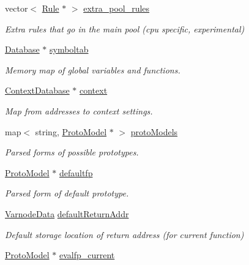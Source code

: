 \begin{DoxyCompactItemize}
vector$<$ \mbox{\hyperlink{class_rule}{Rule}} $\ast$ $>$ \mbox{\hyperlink{class_architecture_a6218d36328733cd9798ad6c3dbe921d8}{extra\+\_\+pool\+\_\+rules}}
\begin{DoxyCompactList}\small\item\em Extra rules that go in the main pool (cpu specific, experimental) \end{DoxyCompactList}\item 
\mbox{\hyperlink{class_database}{Database}} $\ast$ \mbox{\hyperlink{class_architecture_ab426c9baa9013d9826041a4083e844ef}{symboltab}}
\begin{DoxyCompactList}\small\item\em Memory map of global variables and functions. \end{DoxyCompactList}\item 
\mbox{\hyperlink{class_context_database}{Context\+Database}} $\ast$ \mbox{\hyperlink{class_architecture_abbbd3d4cf806f7ca3a2a2943aab28165}{context}}
\begin{DoxyCompactList}\small\item\em Map from addresses to context settings. \end{DoxyCompactList}\item 
map$<$ string, \mbox{\hyperlink{class_proto_model}{Proto\+Model}} $\ast$ $>$ \mbox{\hyperlink{class_architecture_ab15c8b7bbcb9408075014902da4f8687}{proto\+Models}}
\begin{DoxyCompactList}\small\item\em Parsed forms of possible prototypes. \end{DoxyCompactList}\item 
\mbox{\hyperlink{class_proto_model}{Proto\+Model}} $\ast$ \mbox{\hyperlink{class_architecture_a1e0f5d45f6dcd494b15bb55f81f656b2}{defaultfp}}
\begin{DoxyCompactList}\small\item\em Parsed form of default prototype. \end{DoxyCompactList}\item 
\mbox{\hyperlink{struct_varnode_data}{Varnode\+Data}} \mbox{\hyperlink{class_architecture_ad0b5e0d6c22247d4ec2422c81ddec8f8}{default\+Return\+Addr}}
\begin{DoxyCompactList}\small\item\em Default storage location of return address (for current function) \end{DoxyCompactList}\item 
\mbox{\hyperlink{class_proto_model}{Proto\+Model}} $\ast$ \mbox{\hyperlink{class_architecture_a9fb08ee0ed38a4c586a99d0f45a3af6e}{evalfp\+\_\+current}}

\end{DoxyCompactItemize}
